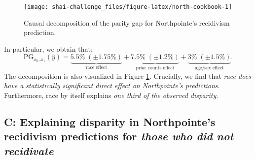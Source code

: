 \documentclass{article}
\newenvironment{Shaded}{\begin{snugshade}}{\end{snugshade}}
\newcommand{\AttributeTok}[1]{\textcolor[rgb]{0.77,0.63,0.00}{#1}}
\newcommand{\ConstantTok}[1]{\textcolor[rgb]{0.00,0.00,0.00}{#1}}
\newcommand{\FunctionTok}[1]{\textcolor[rgb]{0.00,0.00,0.00}{#1}}
\newcommand{\NormalTok}[1]{#1}
\newcommand{\OtherTok}[1]{\textcolor[rgb]{0.56,0.35,0.01}{#1}}
\newcommand{\SpecialCharTok}[1]{\textcolor[rgb]{0.00,0.00,0.00}{#1}}
\newcommand{\StringTok}[1]{\textcolor[rgb]{0.31,0.60,0.02}{#1}}
\begin{document}
\begin{Shaded}
\end{Shaded}

\begin{figure}

{\centering \texttt{[image: shai-challenge\_files/figure-latex/north-cookbook-1]} 

}

\caption{Causal decomposition of the parity gap for Northpointe's recidivism prediction.}\label{fig:north-cookbook}
\end{figure}

In particular, we obtain that: \begin{equation}
  \text{PG}_{x_0, x_1}(\hat{y}) = \underbrace{5.5\% \;(\pm 1.75\%)}_{\text{race effect}} +  \underbrace{7.5\% \;(\pm 1.2\%)}_{\text{prior counts effect}} +  \underbrace{3\%\;(\pm 1.5\%)}_{\text{age/sex effect}}.
\end{equation} The decomposition is also visualized in Figure
\ref{fig:north-cookbook}. Crucially, we find that \emph{race does have a
statistically significant direct effect on Northpointe's predictions}.
Furthermore, race by itself explains \emph{one third of the observed
disparity}.

\hypertarget{c-explaining-disparity-in-northpointes-recidivism-predictions-for-those-who-did-not-recidivate}{%
\subsection{\texorpdfstring{C: Explaining disparity in Northpointe's
recidivism predictions for \emph{those who did not
recidivate}}{C: Explaining disparity in Northpointe's recidivism predictions for those who did not recidivate}}\label{c-explaining-disparity-in-northpointes-recidivism-predictions-for-those-who-did-not-recidivate}}
\end{document}
